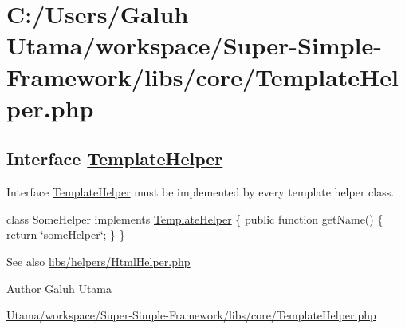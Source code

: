 \hypertarget{_c_1_2_users_2_galuh_01_utama_2workspace_2_super-_simple-_framework_2libs_2core_2_template_helper_8php-example}{\section{\-C\-:/\-Users/\-Galuh Utama/workspace/\-Super-\/\-Simple-\/\-Framework/libs/core/\-Template\-Helper.\-php}
}
\subsection*{\-Interface \hyperlink{interface_template_helper}{\-Template\-Helper}}

\-Interface \hyperlink{interface_template_helper}{\-Template\-Helper} must be implemented by every template helper class. 

{\ttfamily  class \-Some\-Helper implements \hyperlink{interface_template_helper}{\-Template\-Helper} \{ public function get\-Name() \{ return \char`\"{}some\-Helper\char`\"{}; \} \} }

\begin{DoxySeeAlso}{\-See also}
\hyperlink{_html_helper_8php_source}{libs/helpers/\-Html\-Helper.\-php}
\end{DoxySeeAlso}
\begin{DoxyAuthor}{\-Author}
\-Galuh \-Utama
\end{DoxyAuthor}

\begin{DoxyCodeInclude}
\end{DoxyCodeInclude}
 \hyperlink{_template_helper_8php_source}{\-Utama/workspace/\-Super-\/\-Simple-\/\-Framework/libs/core/\-Template\-Helper.\-php} 